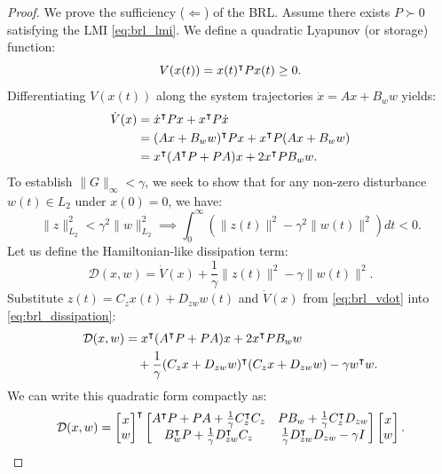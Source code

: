 \begin{proof}
We prove the sufficiency ($\Leftarrow$) of the BRL. Assume there exists $P \succ 0$ satisfying the LMI \eqref{eq:brl_lmi}. We define a quadratic Lyapunov (or storage) function:
\begin{equation}
V(x(t)) = x(t)^\intercal P x(t) \ge 0 .
\end{equation}
Differentiating $V(x(t))$ along the system trajectories $\dot{x} = A x + B_w w$ yields:
\begin{align}
    \dot{V}(x) &= \dot{x}^\intercal P x + x^\intercal P \dot{x} \nonumber \\
    &= (A x + B_w w)^\intercal P x + x^\intercal P (A x + B_w w) \nonumber \\
    &= x^\intercal (A^\intercal P + P A) x + 2 x^\intercal P B_w w . \label{eq:brl_vdot}
\end{align}
To establish $\| G \|_\infty < \gamma$, we seek to show that for any non-zero disturbance $w(t) \in L_2$ under $x(0) = 0$, we have:
\begin{equation}
\| z \|_{L_2}^2 < \gamma^2 \| w \|_{L_2}^2 \implies \int_0^\infty \left( \| z(t) \|^2 - \gamma^2 \| w(t) \|^2 \right) dt < 0 .
\end{equation}
Let us define the Hamiltonian-like dissipation term:
\begin{equation}
    \mathcal{D}(x, w) = \dot{V}(x) + \frac{1}{\gamma} \| z(t) \|^2 - \gamma \| w(t) \|^2 . \label{eq:brl_dissipation}
\end{equation}
Substitute $z(t) = C_z x(t) + D_{zw} w(t)$ and $\dot{V}(x)$ from \eqref{eq:brl_vdot} into \eqref{eq:brl_dissipation}:
\begin{align}
    \mathcal{D}(x, w) &= x^\intercal (A^\intercal P + P A) x + 2 x^\intercal P B_w w \nonumber \\
&\quad + \frac{1}{\gamma} (C_z x + D_{zw} w)^\intercal (C_z x + D_{zw} w) - \gamma w^\intercal w .
\end{align}
We can write this quadratic form compactly as:
\begin{equation}
\mathcal{D}(x, w) = \begin{bmatrix} x \\ w \end{bmatrix}^\trp \begin{bmatrix} A^\trp P + P A + \frac{1}{\gamma} C_z^\trp C_z & P B_w + \frac{1}{\gamma} C_z^\trp D_{zw} \\ B_w^\trp P + \frac{1}{\gamma} D_{zw}^\trp C_z & \frac{1}{\gamma} D_{zw}^\trp D_{zw} - \gamma I \end{bmatrix} \begin{bmatrix} x \\ w \end{bmatrix} .

\end{equation}
\end{proof}
